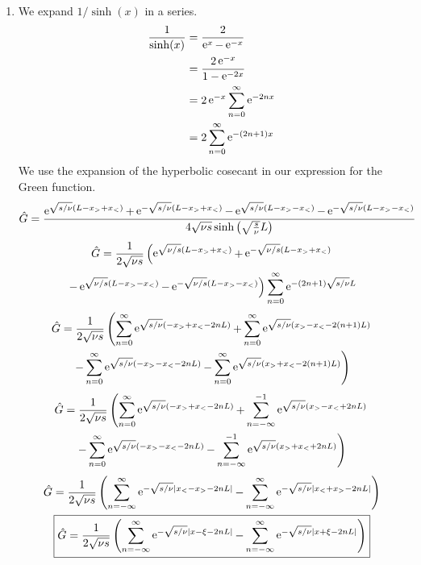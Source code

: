 {\begin{Solution}
\begin{enumerate}
  \item
    We expand $1 / \sinh(x)$ in a series.
    \begin{align*}
      \frac{1}{\sinh(x)} 
      &= \frac{2}{\mathop{\mathrm{e}}\nolimits^x - \mathop{\mathrm{e}}\nolimits^{-x}}
      \\
      &= \frac{2 \mathop{\mathrm{e}}\nolimits^{-x}}{1 - \mathop{\mathrm{e}}\nolimits^{-2 x}}
      \\
      &= 2 \mathop{\mathrm{e}}\nolimits^{-x} \sum_{n=0}^\infty \mathop{\mathrm{e}}\nolimits^{-2 n x}
      \\
      &= 2 \sum_{n=0}^\infty \mathop{\mathrm{e}}\nolimits^{-(2 n + 1) x}
    \end{align*}
    We use the expansion of the hyperbolic cosecant in our expression for the 
    Green function.
    \[
    \hat{G} = \frac{  
      \mathop{\mathrm{e}}\nolimits^{ \sqrt{s/\nu} (L - x_> + x_<) }
      + \mathop{\mathrm{e}}\nolimits^{ - \sqrt{s/\nu} (L - x_> + x_<) }
      - \mathop{\mathrm{e}}\nolimits^{ \sqrt{s/\nu} (L - x_> - x_<) }
      - \mathop{\mathrm{e}}\nolimits^{ - \sqrt{s/\nu} (L - x_> - x_<) } }
    { 4 \sqrt{\nu s} \sinh \left( \sqrt{ \frac{s}{\nu} } L \right) }
    \]
    \begin{multline*}
      \hat{G} = \frac{1}{2 \sqrt{\nu s}} \left(
        \mathop{\mathrm{e}}\nolimits^{ \sqrt{\nu/s} (L - x_> + x_<) }
        + \mathop{\mathrm{e}}\nolimits^{ - \sqrt{\nu/s} (L - x_> + x_<) } \right.
      \\
      \left. - \mathop{\mathrm{e}}\nolimits^{ \sqrt{\nu/s} (L - x_> - x_<) }
        - \mathop{\mathrm{e}}\nolimits^{ - \sqrt{\nu/s} (L - x_> - x_<) } \right)
      \sum_{n=0}^\infty \mathop{\mathrm{e}}\nolimits^{-(2 n + 1) \sqrt{s/\nu} L}
    \end{multline*}
    \begin{multline*}
      \hat{G} = \frac{1}{2 \sqrt{\nu s}} \left(
        \sum_{n=0}^\infty \mathop{\mathrm{e}}\nolimits^{ \sqrt{s/\nu} (- x_> + x_< - 2 n L)}
        + \sum_{n=0}^\infty \mathop{\mathrm{e}}\nolimits^{ \sqrt{s/\nu} (x_> - x_< - 2 (n+1) L)} \right.
      \\
      \left. - \sum_{n=0}^\infty \mathop{\mathrm{e}}\nolimits^{ \sqrt{s/\nu} (- x_> - x_< - 2 n L)}
        - \sum_{n=0}^\infty \mathop{\mathrm{e}}\nolimits^{ \sqrt{s/\nu} (x_> + x_< - 2 (n+1) L)} \right)
    \end{multline*}
    \begin{multline*}
      \hat{G} = \frac{1}{2 \sqrt{\nu s}} \left(
        \sum_{n=0}^\infty \mathop{\mathrm{e}}\nolimits^{ \sqrt{s/\nu} (- x_> + x_< - 2 n L)}
        + \sum_{n=-\infty}^{-1} \mathop{\mathrm{e}}\nolimits^{ \sqrt{s/\nu} (x_> - x_< + 2 n L)} \right.
      \\
      \left. - \sum_{n=0}^\infty \mathop{\mathrm{e}}\nolimits^{ \sqrt{s/\nu} (- x_> - x_< - 2 n L)}
        - \sum_{n=-\infty}^{-1} \mathop{\mathrm{e}}\nolimits^{ \sqrt{s/\nu} (x_> + x_< + 2 n L)} \right)
    \end{multline*}
    \begin{gather*}
      \hat{G} = \frac{1}{2 \sqrt{\nu s}} \left(
        \sum_{n=-\infty}^\infty \mathop{\mathrm{e}}\nolimits^{ - \sqrt{s/\nu} | x_< - x_> - 2 n L|}
        - \sum_{n=-\infty}^\infty \mathop{\mathrm{e}}\nolimits^{ - \sqrt{s/\nu} |x_< + x_> - 2 n L|} \right)
      \\
      \boxed{
        \hat{G} = \frac{1}{2 \sqrt{\nu s}} \left(
          \sum_{n=-\infty}^\infty \mathop{\mathrm{e}}\nolimits^{ - \sqrt{s/\nu} | x - \xi - 2 n L|}
          - \sum_{n=-\infty}^\infty \mathop{\mathrm{e}}\nolimits^{ - \sqrt{s/\nu} |x + \xi - 2 n L|} \right)
        }
    \end{gather*}


\end{enumerate}
\end{Solution}}
